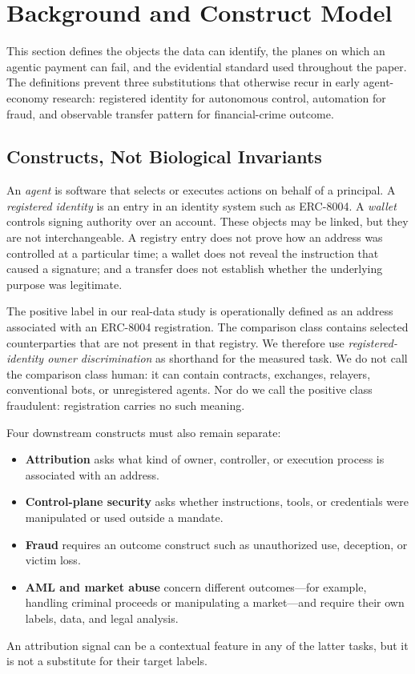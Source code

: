 
\section{Background and Construct Model}\label{sec:background}

This section defines the objects the data can identify, the planes on which an
agentic payment can fail, and the evidential standard used throughout the
paper.  The definitions prevent three substitutions that otherwise recur in
early agent-economy research: registered identity for autonomous control,
automation for fraud, and observable transfer pattern for financial-crime
outcome.

\subsection{Constructs, Not Biological Invariants}\label{subsec:invariants}

An \emph{agent} is software that selects or executes actions on behalf of a
principal.  A \emph{registered identity} is an entry in an identity system such
as ERC-8004\cite{erc8004}.  A \emph{wallet} controls signing authority over an
account.  These objects may be linked, but they are not interchangeable.  A
registry entry does not prove how an address was controlled at a particular
time; a wallet does not reveal the instruction that caused a signature; and a
transfer does not establish whether the underlying purpose was legitimate.

The positive label in our real-data study is operationally defined as an
address associated with an ERC-8004 registration.  The comparison class
contains selected counterparties that are not present in that registry.  We
therefore use \emph{registered-identity owner discrimination} as shorthand for
the measured task.  We do not call the comparison class human: it can contain
contracts, exchanges, relayers, conventional bots, or unregistered agents.
Nor do we call the positive class fraudulent: registration carries no such
meaning.

Four downstream constructs must also remain separate:
\begin{itemize}[leftmargin=*,nosep]
  \item \textbf{Attribution} asks what kind of owner, controller, or execution
    process is associated with an address.
  \item \textbf{Control-plane security} asks whether instructions, tools, or
    credentials were manipulated or used outside a mandate.
  \item \textbf{Fraud} requires an outcome construct such as unauthorized use,
    deception, or victim loss.
  \item \textbf{AML and market abuse} concern different outcomes---for example,
    handling criminal proceeds or manipulating a market---and require their own
    labels, data, and legal analysis.
\end{itemize}
An attribution signal can be a contextual feature in any of the latter tasks,
but it is not a substitute for their target labels.

